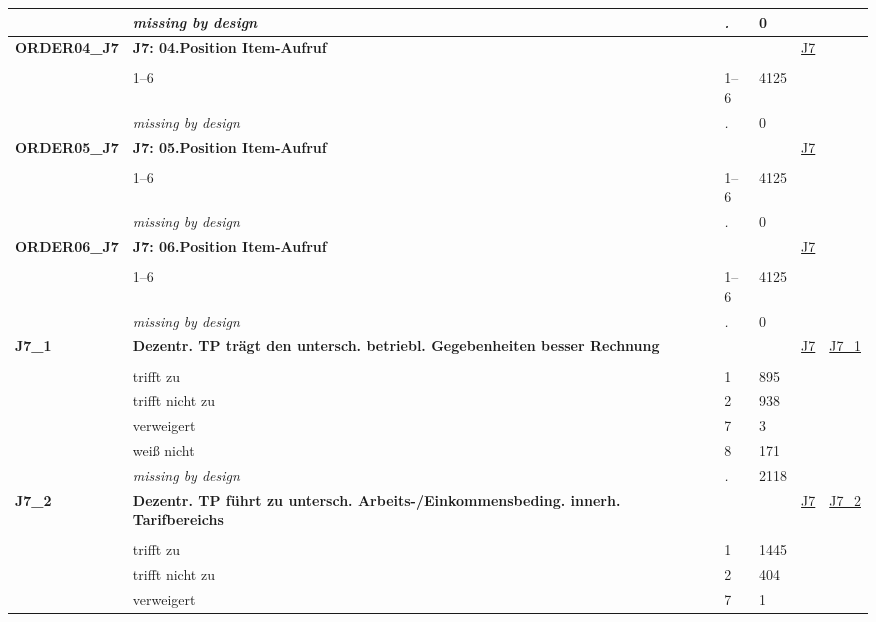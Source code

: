 \begin{longtable}{| L{2.45cm} | L{6cm} | C{1.5cm} | R{1cm} | C{2.25cm} | C{2.25cm} |}
   & \textit{missing by design} & \textit{.} & 0 &  &  \\ 
   \midrule
\textbf{ORDER04\_J7}\label{var:ORDER04:J7} & \textbf{J7: 04.Position Item-Aufruf} &  &  & \hyperref[J7]{J7} & \hyperref[var:suf:]{} \\ 
   &  &  &  &  &  \\ 
   & 1--6 & 1--6 & 4125 &  &  \\ 
   & \textit{missing by design} & \textit{.} & 0 &  &  \\ 
   \midrule
\textbf{ORDER05\_J7}\label{var:ORDER05:J7} & \textbf{J7: 05.Position Item-Aufruf} &  &  & \hyperref[J7]{J7} & \hyperref[var:suf:]{} \\ 
   &  &  &  &  &  \\ 
   & 1--6 & 1--6 & 4125 &  &  \\ 
   & \textit{missing by design} & \textit{.} & 0 &  &  \\ 
   \midrule
\textbf{ORDER06\_J7}\label{var:ORDER06:J7} & \textbf{J7: 06.Position Item-Aufruf} &  &  & \hyperref[J7]{J7} & \hyperref[var:suf:]{} \\ 
   &  &  &  &  &  \\ 
   & 1--6 & 1--6 & 4125 &  &  \\ 
   & \textit{missing by design} & \textit{.} & 0 &  &  \\ 
   \midrule
\textbf{J7\_1}\label{var:J7:1} & \textbf{Dezentr. TP trägt den untersch. betriebl. Gegebenheiten besser Rechnung} &  &  & \hyperref[J7]{J7} & \hyperref[var:suf:J7:1]{J7\_1} \\ 
   &  &  &  &  &  \\ 
   & trifft zu & 1 & 895 &  &  \\ 
   & trifft nicht zu & 2 & 938 &  &  \\ 
   & verweigert & 7 & 3 &  &  \\ 
   & weiß nicht & 8 & 171 &  &  \\ 
   & \textit{missing by design} & \textit{.} & 2118 &  &  \\ 
   \midrule
\textbf{J7\_2}\label{var:J7:2} & \textbf{Dezentr. TP führt zu untersch. Arbeits-/Einkommensbeding. innerh. Tarifbereichs} &  &  & \hyperref[J7]{J7} & \hyperref[var:suf:J7:2]{J7\_2} \\ 
   &  &  &  &  &  \\ 
   & trifft zu & 1 & 1445 &  &  \\ 
   & trifft nicht zu & 2 & 404 &  &  \\ 
   & verweigert & 7 & 1 &  &  \\ 

\end{longtable}
